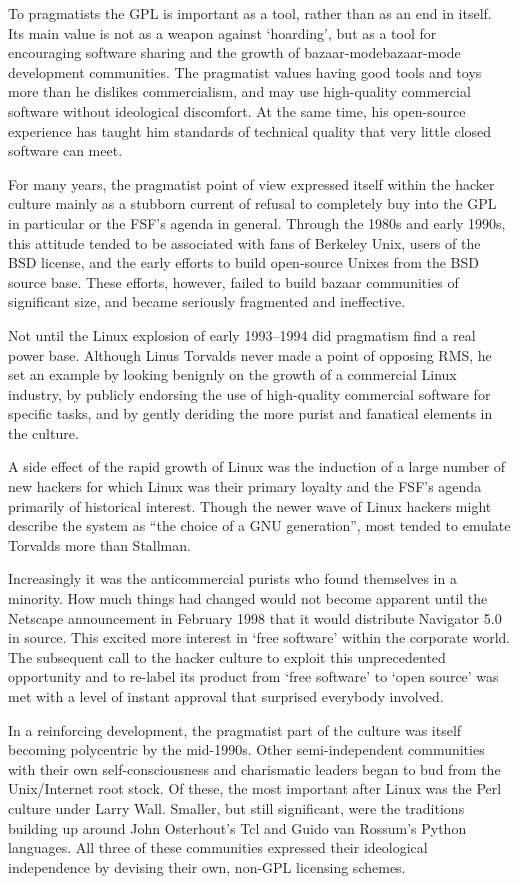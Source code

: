 To pragmatists the GPL is important as a tool, rather than as an end in itself.
Its main value is not as a weapon against `hoarding', but as a tool for
encouraging software sharing and the growth of bazaar-modebazaar-mode
development communities.  The pragmatist values having good tools and toys more
than he dislikes commercialism, and may use high-quality commercial software
without ideological discomfort.  At the same time, his open-source experience
has taught him standards of technical quality that very little closed software
can meet.

For many years, the pragmatist point of view expressed itself within the hacker
culture mainly as a stubborn current of refusal to completely buy into the GPL
in particular or the FSF's agenda in general.  Through the 1980s and early
1990s, this attitude tended to be associated with fans of Berkeley Unix, users
of the BSD license, and the early efforts to build open-source Unixes from the
BSD source base.  These efforts, however, failed to build bazaar communities of
significant size, and became seriously fragmented and ineffective.

Not until the Linux explosion of early 1993–1994 did pragmatism find a real
power base.  Although Linus Torvalds never made a point of opposing RMS, he set
an example by looking benignly on the growth of a commercial Linux industry, by
publicly endorsing the use of high-quality commercial software for specific
tasks, and by gently deriding the more purist and fanatical elements in the
culture.

A side effect of the rapid growth of Linux was the induction of a large number
of new hackers for which Linux was their primary loyalty and the FSF's agenda
primarily of historical interest.  Though the newer wave of Linux hackers might
describe the system as ``the choice of a GNU generation'', most tended to
emulate Torvalds more than Stallman.

Increasingly it was the anticommercial purists who found themselves in a
minority.  How much things had changed would not become apparent until the
Netscape announcement in February 1998 that it would distribute Navigator 5.0 in
source.  This excited more interest in `free software' within the corporate
world.  The subsequent call to the hacker culture to exploit this unprecedented
opportunity and to re-label its product from `free software' to `open source'
was met with a level of instant approval that surprised everybody involved.

In a reinforcing development, the pragmatist part of the culture was itself
becoming polycentric by the mid-1990s.  Other semi-independent communities with
their own self-consciousness and charismatic leaders began to bud from the
Unix/Internet root stock.  Of these, the most important after Linux was the Perl
culture under Larry Wall.  Smaller, but still significant, were the traditions
building up around John Osterhout's Tcl and Guido van Rossum's Python languages.
All three of these communities expressed their ideological independence by
devising their own, non-GPL licensing schemes.
